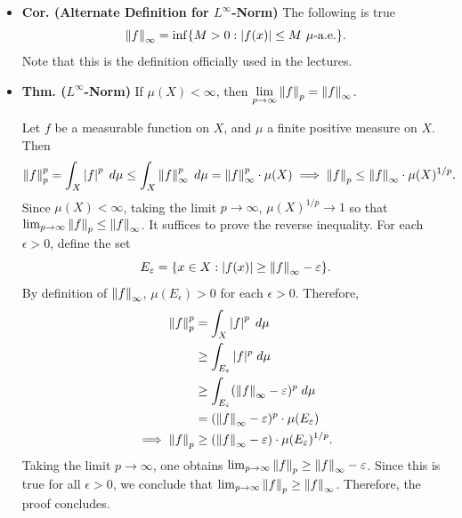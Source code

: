 \documentclass{article}
\begin{document}
\begin{itemize}
\begin{equation}
			\norm{f}_{\infty} \coloneqq \sup_{x \in X}\abs{f(x)}.
		\end{equation}
	\item \textbf{Cor. (Alternate Definition for $L^{\infty}$-Norm)} The following is true 
		\begin{equation}
			\norm{f}_{\infty} = \inf\brac*{M > 0: \abs{f(x)} \leq M \text{ $\mu$-a.e.}}.
		\end{equation}
	Note that this is the definition officially used in the lectures. 
	\item \textbf{Thm. ($L^{\infty}$-Norm)} If $\mu(X) < \infty$, then $\lim\limits_{p \to \infty}\left\Vert f \right\Vert_{p} = \left\Vert f \right\Vert_{\infty}$.\newline
	\begin{solutions}
		Let $f$ be a measurable function on $X$, and $\mu$ a finite positive measure on $X$. Then 
			\begin{equation}
				\left\Vert f \right\Vert_{p}^{p} = \int_{X}\left| f \right|^{p}\;d\mu \leq \int_{X} \left\Vert f \right\Vert_{\infty}^{p}\;d\mu = \left\Vert f \right\Vert_{\infty}^{p}\cdot \mu(X) \implies \left\Vert f \right\Vert_{p} \leq \left\Vert f \right\Vert_{\infty} \cdot \mu(X)^{1/p}. 
			\end{equation}
		Since $\mu(X) < \infty$, taking the limit $p \to \infty$, $\mu(X)^{1/p} \to 1$ so that $\lim_{p \to \infty}\left\Vert f \right\Vert_{p} \leq \left\Vert f \right\Vert_{\infty}$. It suffices to prove the reverse inequality. For each $\epsilon > 0$, define the set 
			\begin{equation}
				E_{\epsilon} = \brac*{x \in X: |f(x)| \geq \norm{f}_{\infty} - \epsilon}. 
			\end{equation} 
		By definition of $\left\Vert f \right\Vert_{\infty}$, $\mu(E_{\epsilon}) > 0$ for each $\epsilon > 0$. Therefore, 
			\begin{align}
				\begin{split}
					\left\Vert f \right\Vert_{p}^{p} &= \int_{X}\left| f \right|^{p}\;d\mu \\
					&\geq \int_{E_{\varepsilon}}|f|^{p}\;d\mu \\
					&\geq \int_{E_{\varepsilon}}(\left\Vert f \right\Vert_{\infty} - \varepsilon)^{p}\;d\mu \\
					&= (\left\Vert f \right\Vert_{\infty} - \varepsilon)^{p} \cdot \mu(E_{\varepsilon}) \\
					\implies 
					\left\Vert f \right\Vert_{p} &\geq (\left\Vert f \right\Vert_{\infty} - \varepsilon) \cdot \mu(E_{\varepsilon})^{1/p}.
				\end{split}
			\end{align}
		Taking the limit $p \to \infty$, one obtains $\lim_{p \to \infty}\left\Vert f \right\Vert_{p} \geq \left\Vert f \right\Vert_{\infty} - \varepsilon$. Since this is true for all $\epsilon > 0$, we conclude that $\lim_{p \to \infty}\left\Vert f \right\Vert_{p} \geq \left\Vert f \right\Vert_{\infty}$. Therefore, the proof concludes. 
	\end{solutions}
\end{itemize}
\newpage 
\end{document}
